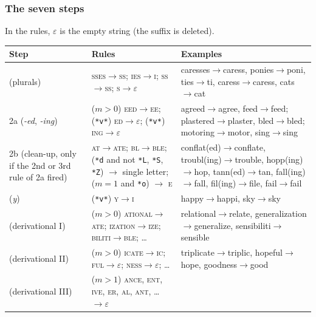 \subsubsection{The seven steps}

In the rules, $\varepsilon$ is the empty string (the suffix is deleted).

\begin{center}
\footnotesize
\begin{tabularx}{\linewidth}{@{}>{\raggedright\arraybackslash}p{1.9cm} >{\raggedright\arraybackslash}X >{\raggedright\arraybackslash}X@{}}
\toprule
\textbf{Step} & \textbf{Rules} & \textbf{Examples} \\
\midrule
1 (plurals) & \textsc{sses}$\to$\textsc{ss};\; \textsc{ies}$\to$\textsc{i};\;
  \textsc{ss}$\to$\textsc{ss};\; \textsc{s}$\to\varepsilon$ &
  caresses$\to$caress, ponies$\to$poni, ties$\to$ti, caress$\to$caress, cats$\to$cat \\
\addlinespace
2a (\emph{-ed}, \emph{-ing}) & ($m{>}0$) \textsc{eed}$\to$\textsc{ee};\;
  (\texttt{*v*}) \textsc{ed}$\to\varepsilon$;\; (\texttt{*v*}) \textsc{ing}$\to\varepsilon$ &
  agreed$\to$agree, feed$\to$feed; plastered$\to$plaster, bled$\to$bled;
  motoring$\to$motor, sing$\to$sing \\
\addlinespace
2b (clean-up, only if the 2nd or 3rd rule of 2a fired) &
  \textsc{at}$\to$\textsc{ate};\; \textsc{bl}$\to$\textsc{ble};\;
  (\texttt{*d} and not \texttt{*L}, \texttt{*S}, \texttt{*Z}) $\to$ single letter;\;
  ($m{=}1$ and \texttt{*o}) $\to$ \textsc{e} &
  conflat(ed)$\to$conflate, troubl(ing)$\to$trouble, hopp(ing)$\to$hop,
  tann(ed)$\to$tan, fall(ing)$\to$fall, fil(ing)$\to$file, fail$\to$fail \\
\addlinespace
3 (\emph{y}) & (\texttt{*v*}) \textsc{y}$\to$\textsc{i} & happy$\to$happi, sky$\to$sky \\
\addlinespace
4 (derivational I) & ($m{>}0$) \textsc{ational}$\to$\textsc{ate};\;
  \textsc{ization}$\to$\textsc{ize};\; \textsc{biliti}$\to$\textsc{ble};\; \ldots &
  relational$\to$relate, generalization$\to$generalize, sensibiliti$\to$sensible \\
\addlinespace
5 (derivational II) & ($m{>}0$) \textsc{icate}$\to$\textsc{ic};\;
  \textsc{ful}$\to\varepsilon$;\; \textsc{ness}$\to\varepsilon$;\; \ldots &
  triplicate$\to$triplic, hopeful$\to$hope, goodness$\to$good \\
\addlinespace
6 (derivational III) & ($m{>}1$) \textsc{ance}, \textsc{ent}, \textsc{ive},
  \textsc{er}, \textsc{al}, \textsc{ant}, \ldots $\to\varepsilon$ &

\end{tabularx}
\end{center}
